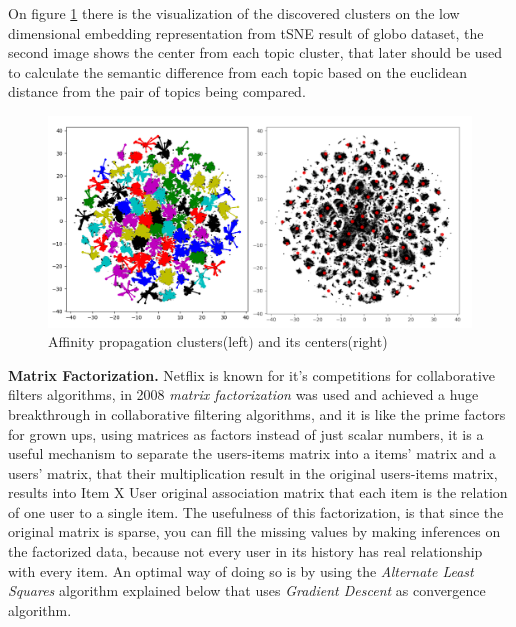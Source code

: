 \documentclass[ecp,tc,english]{iiufrgs}
\begin{document}
    On figure \ref{fig:affinity_twins} there is the visualization of the discovered clusters on the low dimensional embedding representation from tSNE result of globo dataset, the second image shows the center from each topic cluster, that later should be used to calculate the semantic difference from each topic based on the euclidean distance from the pair of topics being compared.
     
    \begin{figure}[H]
        \centering
        \includegraphics[width=1\textwidth]{images/affinity_twins.png}
        \caption{Affinity propagation clusters(left) and its centers(right)}
        \label{fig:affinity_twins}
    \end{figure}
    
    \textbf{Matrix Factorization.} Netflix is known for it's competitions for collaborative filters algorithms, in 2008 \textit{matrix factorization} \cite{10.5555/1087620} was used and achieved a huge breakthrough in collaborative filtering algorithms, and it is like the prime factors for grown ups, using matrices as factors instead of just scalar numbers, it is a useful mechanism to separate the users-items matrix into a items' matrix and a users' matrix, that their multiplication result in the original users-items matrix, results into Item X User original association matrix that each item is the relation of one user to a single item.
    The usefulness of this factorization, is that since the original matrix is sparse, you can fill the missing values by making inferences on the factorized data, because not every user in its history has real relationship with every item.
    An optimal way of doing so is by using the \textit{Alternate Least Squares} algorithm explained below that uses  \textit{Gradient Descent} as convergence algorithm.
    
\end{document}
